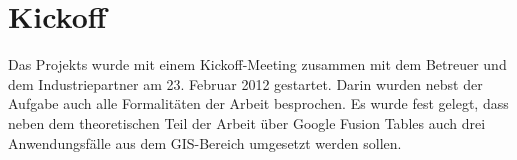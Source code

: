 \section{Kickoff}
Das Projekts wurde mit einem Kickoff-Meeting zusammen mit dem Betreuer und dem Industriepartner am 23. Februar 2012 gestartet. Darin wurden nebst der Aufgabe auch alle Formalitäten der Arbeit besprochen. Es wurde fest gelegt, dass neben dem theoretischen Teil der Arbeit über Google Fusion Tables auch drei Anwendungsfälle aus dem \gls{GIS}-Bereich umgesetzt werden sollen.